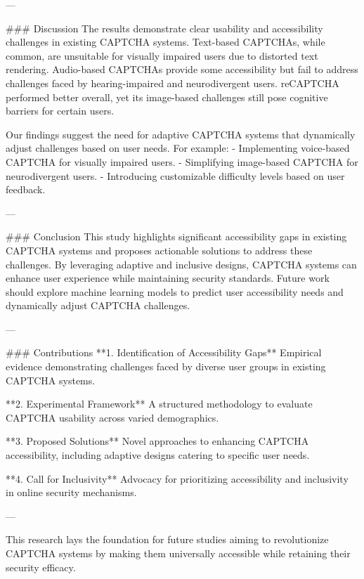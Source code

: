 ---

### Discussion  
The results demonstrate clear usability and accessibility challenges in existing CAPTCHA systems. Text-based CAPTCHAs, while common, are unsuitable for visually impaired users due to distorted text rendering. Audio-based CAPTCHAs provide some accessibility but fail to address challenges faced by hearing-impaired and neurodivergent users. reCAPTCHA performed better overall, yet its image-based challenges still pose cognitive barriers for certain users.

Our findings suggest the need for adaptive CAPTCHA systems that dynamically adjust challenges based on user needs. For example:
- Implementing voice-based CAPTCHA for visually impaired users.
- Simplifying image-based CAPTCHA for neurodivergent users.
- Introducing customizable difficulty levels based on user feedback.

---

### Conclusion  
This study highlights significant accessibility gaps in existing CAPTCHA systems and proposes actionable solutions to address these challenges. By leveraging adaptive and inclusive designs, CAPTCHA systems can enhance user experience while maintaining security standards. Future work should explore machine learning models to predict user accessibility needs and dynamically adjust CAPTCHA challenges.

---

### Contributions  
**1. Identification of Accessibility Gaps**  
Empirical evidence demonstrating challenges faced by diverse user groups in existing CAPTCHA systems.

**2. Experimental Framework**  
A structured methodology to evaluate CAPTCHA usability across varied demographics.

**3. Proposed Solutions**  
Novel approaches to enhancing CAPTCHA accessibility, including adaptive designs catering to specific user needs.

**4. Call for Inclusivity**  
Advocacy for prioritizing accessibility and inclusivity in online security mechanisms.

--- 

This research lays the foundation for future studies aiming to revolutionize CAPTCHA systems by making them universally accessible while retaining their security efficacy.